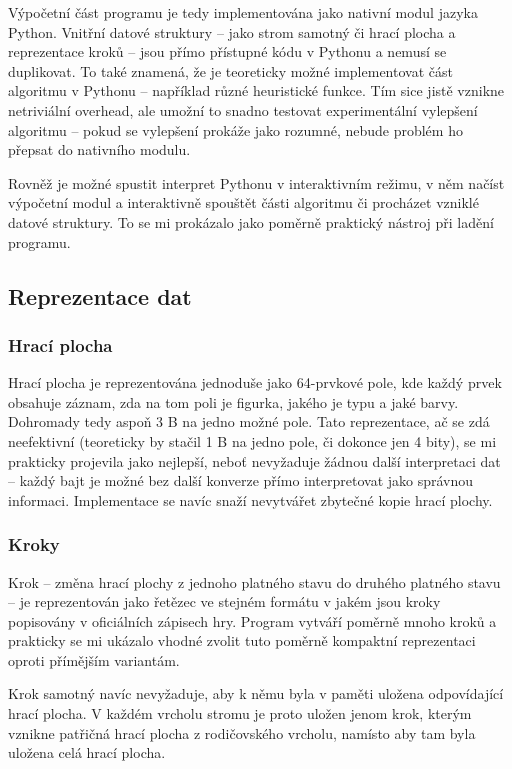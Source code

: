 \documentclass{article}
\begin{document}
Výpočetní část programu je tedy implementována jako nativní modul jazyka Python. Vnitřní datové struktury -- jako strom
samotný či hrací plocha a reprezentace kroků -- jsou přímo přístupné kódu v Pythonu a nemusí se duplikovat. To také
znamená, že je teoreticky možné implementovat část algoritmu v Pythonu -- například různé heuristické funkce. Tím sice
jistě vznikne netriviální overhead, ale umožní to snadno testovat experimentální vylepšení algoritmu -- pokud se
vylepšení prokáže jako rozumné, nebude problém ho přepsat do nativního modulu.

Rovněž je možné spustit interpret Pythonu v interaktivním režimu, v něm načíst výpočetní modul a interaktivně spouštět
části algoritmu či procházet vzniklé datové struktury. To se mi prokázalo jako poměrně praktický nástroj při ladění
programu.

\subsection{Reprezentace dat}
\subsubsection{Hrací plocha}
Hrací plocha je reprezentována jednoduše jako 64-prvkové pole, kde každý prvek obsahuje záznam, zda na tom poli je figurka,
jakého je typu a jaké barvy. Dohromady tedy aspoň 3 B na jedno možné pole. Tato reprezentace, ač se zdá neefektivní
(teoreticky by stačil 1 B na jedno pole, či dokonce jen 4 bity), se mi prakticky projevila jako nejlepší, neboť
nevyžaduje žádnou další interpretaci dat -- každý bajt je možné bez další konverze přímo interpretovat jako správnou
informaci. Implementace se navíc snaží nevytvářet zbytečné kopie hrací plochy.

\subsubsection{Kroky}
Krok -- změna hrací plochy z jednoho platného stavu do druhého platného stavu -- je reprezentován jako řetězec ve
stejném formátu v jakém jsou kroky popisovány v oficiálních zápisech hry. Program vytváří poměrně mnoho kroků a
prakticky se mi ukázalo vhodné zvolit tuto poměrně kompaktní reprezentaci oproti přímějším variantám.

Krok samotný navíc nevyžaduje, aby k němu byla v paměti uložena odpovídající hrací plocha. V každém vrcholu stromu je
proto uložen jenom krok, kterým vznikne patřičná hrací plocha z rodičovského vrcholu, namísto aby tam byla uložena celá
hrací plocha.
\end{document}
